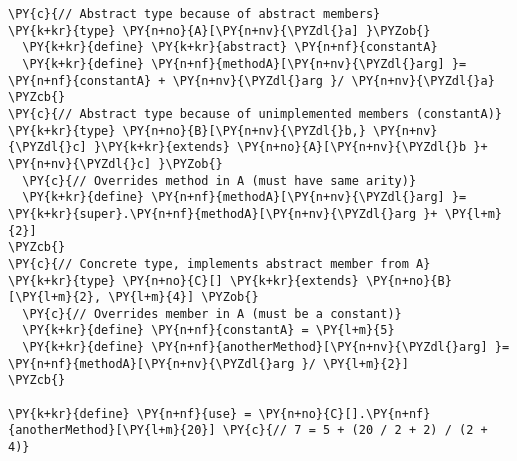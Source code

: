 \begin{Verbatim}[commandchars=\\\{\}]
\PY{c}{// Abstract type because of abstract members}
\PY{k+kr}{type} \PY{n+no}{A}[\PY{n+nv}{\PYZdl{}a] }\PYZob{}
  \PY{k+kr}{define} \PY{k+kr}{abstract} \PY{n+nf}{constantA}
  \PY{k+kr}{define} \PY{n+nf}{methodA}[\PY{n+nv}{\PYZdl{}arg] }= \PY{n+nf}{constantA} + \PY{n+nv}{\PYZdl{}arg }/ \PY{n+nv}{\PYZdl{}a}
\PYZcb{}
\PY{c}{// Abstract type because of unimplemented members (constantA)}
\PY{k+kr}{type} \PY{n+no}{B}[\PY{n+nv}{\PYZdl{}b,} \PY{n+nv}{\PYZdl{}c] }\PY{k+kr}{extends} \PY{n+no}{A}[\PY{n+nv}{\PYZdl{}b }+ \PY{n+nv}{\PYZdl{}c] }\PYZob{}
  \PY{c}{// Overrides method in A (must have same arity)}
  \PY{k+kr}{define} \PY{n+nf}{methodA}[\PY{n+nv}{\PYZdl{}arg] }= \PY{k+kr}{super}.\PY{n+nf}{methodA}[\PY{n+nv}{\PYZdl{}arg }+ \PY{l+m}{2}]
\PYZcb{}
\PY{c}{// Concrete type, implements abstract member from A}
\PY{k+kr}{type} \PY{n+no}{C}[] \PY{k+kr}{extends} \PY{n+no}{B}[\PY{l+m}{2}, \PY{l+m}{4}] \PYZob{}
  \PY{c}{// Overrides member in A (must be a constant)}
  \PY{k+kr}{define} \PY{n+nf}{constantA} = \PY{l+m}{5}
  \PY{k+kr}{define} \PY{n+nf}{anotherMethod}[\PY{n+nv}{\PYZdl{}arg] }= \PY{n+nf}{methodA}[\PY{n+nv}{\PYZdl{}arg }/ \PY{l+m}{2}]
\PYZcb{}

\PY{k+kr}{define} \PY{n+nf}{use} = \PY{n+no}{C}[].\PY{n+nf}{anotherMethod}[\PY{l+m}{20}] \PY{c}{// 7 = 5 + (20 / 2 + 2) / (2 + 4)}
\end{Verbatim}

